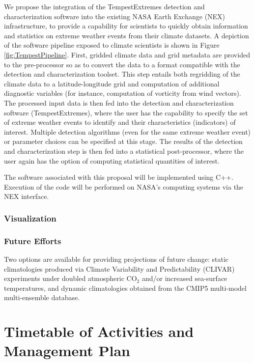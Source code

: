 \documentclass[11pt]{article}
\begin{document}
We propose the integration of the TempestExtremes detection and characterization software into the existing NASA Earth Exchange (NEX) infrastructure, to provide a capability for scientists to quickly obtain information and statistics on extreme weather events from their climate datasets.  A depiction of the software pipeline exposed to climate scientists is shown in Figure \ref{fig:TempestPipeline}.  First, gridded climate data and grid metadata are provided to the pre-processor so as to convert the data to a format compatible with the detection and characterization toolset.  This step entails both regridding of the climate data to a latitude-longitude grid and computation of additional diagnostic variables (for instance, computation of vorticity from wind vectors).  The processed input data is then fed into the detection and characterization software (TempestExtremes), where the user has the capability to specify the set of extreme weather events to identify and their characteristics (indicators) of interest.  Multiple detection algorithms (even for the same extreme weather event) or parameter choices can be specified at this stage.  The results of the detection and characterization step is then fed into a statistical post-processor, where the user again has the option of computing statistical quantities of interest.

The software associated with this proposal will be implemented using C++.  Execution of the code will be performed on NASA's computing systems via the NEX interface.

\subsubsection{Visualization}

\subsubsection{Future Efforts}

Two options are available for providing projections of future change: static climatologies produced via Climate Variability and Predictability (CLIVAR) experiments under doubled atmospheric CO$_2$ and/or increased sea-surface temperatures, and dynamic climatologies obtained from the CMIP5 multi-model multi-ensemble database.

\section{Timetable of Activities and Management Plan} \label{sec:Timeline}
\end{document}
